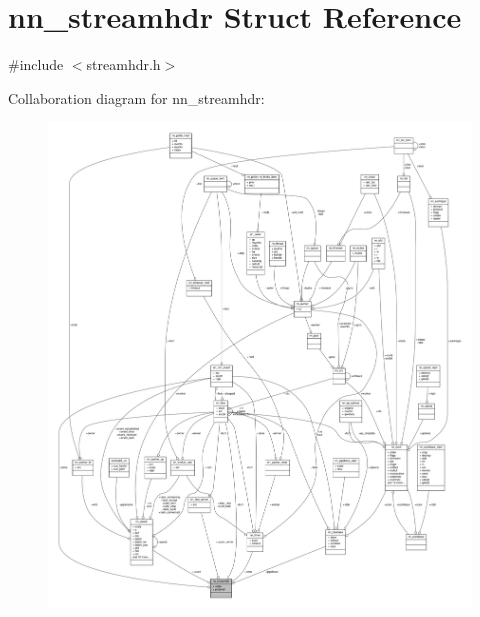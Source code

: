 \hypertarget{structnn__streamhdr}{}\section{nn\+\_\+streamhdr Struct Reference}
\label{structnn__streamhdr}


{\ttfamily \#include $<$streamhdr.\+h$>$}



Collaboration diagram for nn\+\_\+streamhdr\+:\nopagebreak
\begin{figure}[H]
\begin{center}
\leavevmode
\includegraphics[width=350pt]{structnn__streamhdr__coll__graph}
\end{center}
\end{figure}
